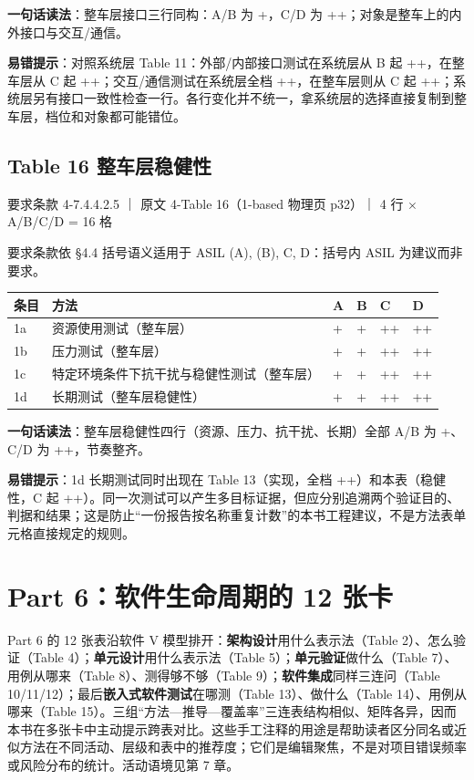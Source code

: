 \textbf{一句话读法}：整车层接口三行同构：A/B 为 +，C/D 为 ++；对象是整车上的内外接口与交互/通信。

\textbf{易错提示}：对照系统层 Table 11：外部/内部接口测试在系统层从 B 起 ++，在整车层从 C 起 ++；交互/通信测试在系统层全档 ++，在整车层则从 C 起 ++；系统层另有接口一致性检查一行。各行变化并不统一，拿系统层的选择直接复制到整车层，档位和对象都可能错位。

\subsection{Table 16 整车层稳健性}

要求条款 4-7.4.4.2.5 ｜ 原文 4-Table 16（1-based 物理页 p32）｜ 4 行 \(\times\) A/B/C/D = 16 格

\begin{noteblock}
要求条款依 §4.4 括号语义适用于 ASIL (A), (B), C, D：括号内 ASIL 为建议而非要求。
\end{noteblock}

\begin{center}
\begingroup\small
\setlength{\tabcolsep}{4pt}
\begin{tabularx}{\linewidth}{@{}XXXXXX@{}}
\toprule
条目 & 方法 & A & B & C & D \\
\midrule
1a & 资源使用测试（整车层） & + & + & ++ & ++ \\
1b & 压力测试（整车层） & + & + & ++ & ++ \\
1c & 特定环境条件下抗干扰与稳健性测试（整车层） & + & + & ++ & ++ \\
1d & 长期测试（整车层稳健性） & + & + & ++ & ++ \\
\bottomrule
\end{tabularx}
\endgroup
\end{center}

\textbf{一句话读法}：整车层稳健性四行（资源、压力、抗干扰、长期）全部 A/B 为 +、C/D 为 ++，节奏整齐。

\textbf{易错提示}：1d 长期测试同时出现在 Table 13（实现，全档 ++）和本表（稳健性，C 起 ++）。同一次测试可以产生多目标证据，但应分别追溯两个验证目的、判据和结果；这是防止“一份报告按名称重复计数”的本书工程建议，不是方法表单元格直接规定的规则。

\section{Part 6：软件生命周期的 12 张卡}

Part 6 的 12 张表沿软件 V 模型排开：\textbf{架构设计}用什么表示法（Table 2）、怎么验证（Table 4）；\textbf{单元设计}用什么表示法（Table 5）；\textbf{单元验证}做什么（Table 7）、用例从哪来（Table 8）、测得够不够（Table 9）；\textbf{软件集成}同样三连问（Table 10/11/12）；最后\textbf{嵌入式软件测试}在哪测（Table 13）、做什么（Table 14）、用例从哪来（Table 15）。三组“方法—推导—覆盖率”三连表结构相似、矩阵各异，因而本书在多张卡中主动提示跨表对比。这些手工注释的用途是帮助读者区分同名或近似方法在不同活动、层级和表中的推荐度；它们是编辑聚焦，不是对项目错误频率或风险分布的统计。活动语境见第 7 章。

